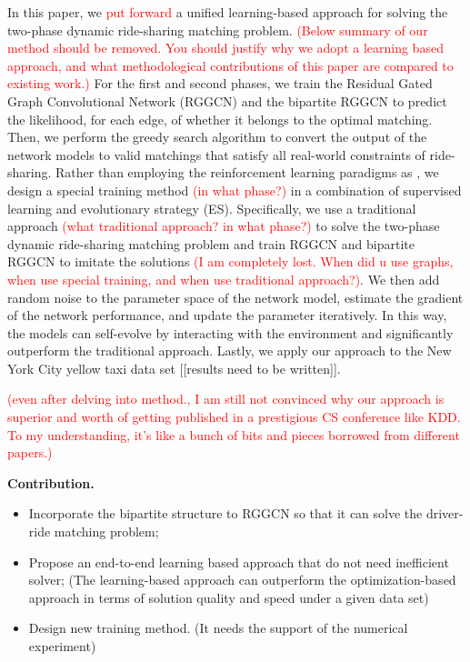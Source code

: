 \documentclass[sigconf]{acmart}
\newcommand{\tcr}[1]{{\textcolor{red}{#1}}}
\begin{document}
In this paper, we \tcr{put forward} a unified learning-based approach for
solving the two-phase dynamic ride-sharing matching problem. 
\tcr{(Below summary of our method should be removed. You should justify why we adopt a learning based approach, and what methodological contributions of this paper are compared to existing work.)}
For the
first and second phases, we train the Residual Gated Graph Convolutional
Network (RGGCN) \cite{bresson2017residual,joshi2019efficient} and
the bipartite RGGCN to predict the likelihood, for each edge, of whether
it belongs to the optimal matching. Then, we perform the greedy search
algorithm to convert the output of the network models to valid matchings
that satisfy all real-world constraints of ride-sharing. Rather than
employing the reinforcement learning paradigms as \cite{li2019efficient,al2019deeppool,jintao2020learning,shah2020neural,qin2021reinforcement},
we design a special training method \tcr{(in what phase?)} in a combination of supervised
learning and evolutionary strategy (ES). Specifically, we use a traditional
approach \tcr{(what traditional approach? in what phase?)} to solve the two-phase dynamic ride-sharing matching problem
and train RGGCN and bipartite RGGCN to imitate the solutions \tcr{(I am completely lost. When did u use graphs, when use special training, and when use traditional approach?)}. We then
add random noise to the parameter space of the network model, estimate
the gradient of the network performance, and update the parameter
iteratively. In this way, the models can self-evolve by interacting
with the environment and significantly outperform the traditional
approach. Lastly, we apply our approach to the New York City yellow
taxi data set \cite{nycwebsite} {[}{[}results need to be written{]}{]}. 

\tcr{(even after delving into method., I am still not convinced why our approach is superior and worth of getting published in a prestigious CS conference like KDD. To my understanding, it's like a bunch of bits and pieces borrowed from different papers.)}

\textbf{Contribution.}
\begin{itemize}
  \item Incorporate the bipartite structure to RGGCN so that it can solve the driver-ride matching problem;
  \item Propose an end-to-end learning based approach that do not need inefficient solver;
  (The learning-based approach can outperform the optimization-based approach in terms of solution quality and speed under a given data set)
  \item Design new training method. (It needs the support of the numerical experiment)
\end{itemize}
\end{document}
